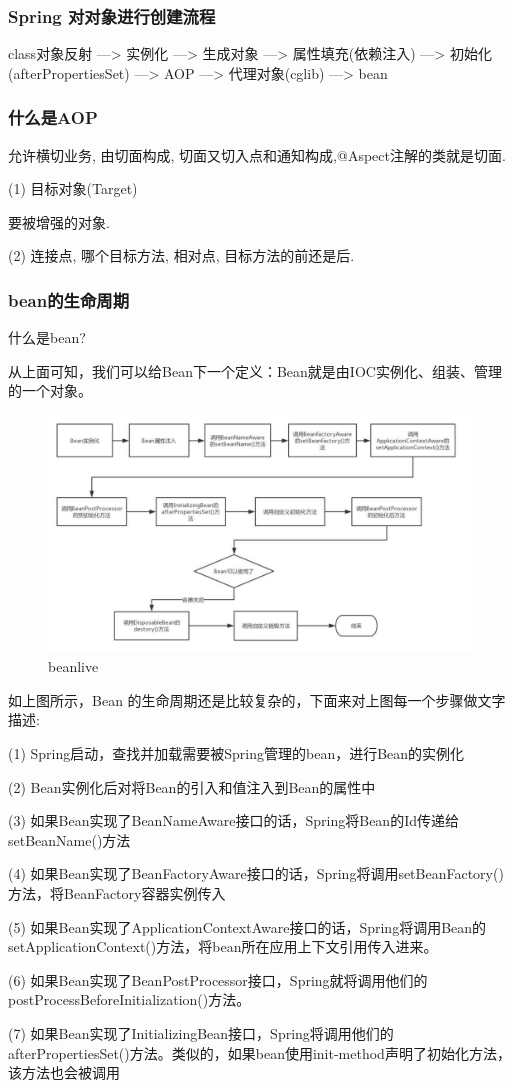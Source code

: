 \documentclass[UTF8]{ctexart}
\begin{document}
\subsubsection{Spring 对对象进行创建流程}
class对象反射 ---> 实例化 ---> 生成对象 ---> 属性填充(依赖注入)  ---> 初始化(afterPropertiesSet) ---> AOP ---> 代理对象(cglib) ---> bean
\subsubsection{什么是AOP}
允许横切业务, 由切面构成, 切面又切入点和通知构成,@Aspect注解的类就是切面. \par
(1) 目标对象(Target) \par
要被增强的对象. \par
(2) 连接点, 哪个目标方法, 相对点, 目标方法的前还是后.
\subsubsection{bean的生命周期}
什么是bean? \par
从上面可知，我们可以给Bean下一个定义：Bean就是由IOC实例化、组装、管理的一个对象。
\begin{figure}
	\centering
	\includegraphics[width=0.7\linewidth]{figures/bean_live.jpg}
	\caption{beanlive}
	\label{fig:bean_live}

\end{figure}
如上图所示，Bean 的生命周期还是比较复杂的，下面来对上图每一个步骤做文字描述: \par
(1) Spring启动，查找并加载需要被Spring管理的bean，进行Bean的实例化 \par
(2) Bean实例化后对将Bean的引入和值注入到Bean的属性中 \par
(3) 如果Bean实现了BeanNameAware接口的话，Spring将Bean的Id传递给setBeanName()方法 \par
(4) 如果Bean实现了BeanFactoryAware接口的话，Spring将调用setBeanFactory()方法，将BeanFactory容器实例传入 \par
(5) 如果Bean实现了ApplicationContextAware接口的话，Spring将调用Bean的setApplicationContext()方法，将bean所在应用上下文引用传入进来。 \par
(6) 如果Bean实现了BeanPostProcessor接口，Spring就将调用他们的postProcessBeforeInitialization()方法。\par
(7) 如果Bean实现了InitializingBean接口，Spring将调用他们的afterPropertiesSet()方法。类似的，如果bean使用init-method声明了初始化方法，该方法也会被调用 \par
\end{document}
